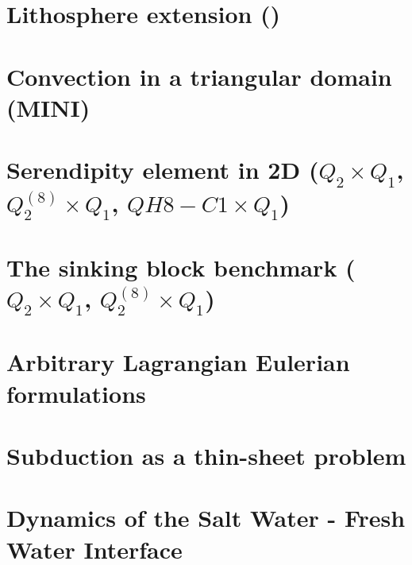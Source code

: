 \documentclass[a4paper,11pt]{report}
\begin{document}
\chapter{Lithosphere extension (\QtwoQone)\label{f50}} %

\chapter{Convection in a triangular domain (MINI)\label{f51}} %

\chapter{Serendipity element in 2D ($Q_2\times Q_1$, $Q_2^{(8)}\times Q_1$, $QH8-C1\times Q_1$) \label{f52}} %

\chapter{The sinking block benchmark ($Q_2\times Q_1$, $Q_2^{(8)}\times Q_1$) \label{f53}} %

\chapter{Arbitrary Lagrangian Eulerian formulations \label{f54}} %

\chapter{Subduction as a thin-sheet problem  \label{f55}} %

\chapter{Dynamics of the Salt Water - Fresh Water Interface \label{f56}} %
\end{document}
